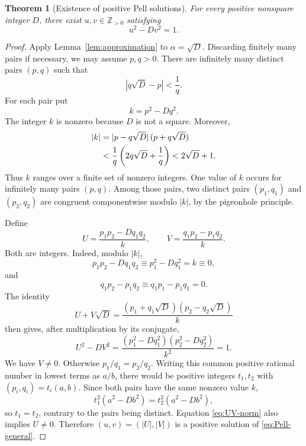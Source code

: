 \documentclass[11pt,a4paper]{amsart}
\newtheorem{theorem}{Theorem}[section]
\theoremstyle{definition}
\newcommand{\Z}{\mathbb Z}
\numberwithin{equation}{section}
\begin{document}
\begin{theorem}[Existence of positive Pell solutions]
\label{thm:Pell-existence}
For every positive nonsquare integer \(D\), there exist \(u,v\in\Z_{>0}\) satisfying
\begin{equation}
 u^2-Dv^2=1.
 \label{eq:Pell-general}
\end{equation}
\end{theorem}

\begin{proof}
Apply Lemma~\ref{lem:approximation} to \(\alpha=\sqrt D\).  Discarding finitely many
pairs if necessary, we may assume \(p,q>0\).  There are infinitely many distinct
pairs \((p,q)\) such that
\begin{equation}
 |q\sqrt D-p|<\frac1q.
 \label{eq:Pell-approx}
\end{equation}
For each pair put
\begin{equation}
 k=p^2-Dq^2.
\end{equation}
The integer \(k\) is nonzero because \(D\) is not a square.  Moreover,
\begin{align}
 |k|
 &=|p-q\sqrt D|\,(p+q\sqrt D)\notag\\
 &<\frac1q\left(2q\sqrt D+\frac1q\right)
 <2\sqrt D+1.
 \label{eq:k-bound}
\end{align}
Thus \(k\) ranges over a finite set of nonzero integers.  One value of \(k\) occurs
for infinitely many pairs \((p,q)\).  Among those pairs, two distinct pairs
\((p_1,q_1)\) and \((p_2,q_2)\) are congruent componentwise modulo \(|k|\), by the
pigeonhole principle.

Define
\begin{equation}
 U=\frac{p_1p_2-Dq_1q_2}{k},
 \qquad
 V=\frac{q_1p_2-p_1q_2}{k}.
 \label{eq:UV-construction}
\end{equation}
Both are integers.  Indeed, modulo \(|k|\),
\begin{equation}
 p_1p_2-Dq_1q_2\equiv p_1^2-Dq_1^2=k\equiv0,
\end{equation}
and
\begin{equation}
 q_1p_2-p_1q_2\equiv q_1p_1-p_1q_1=0.
\end{equation}
The identity
\begin{equation}
 U+V\sqrt D
 =\frac{(p_1+q_1\sqrt D)(p_2-q_2\sqrt D)}{k}
 \label{eq:UV-product}
\end{equation}
then gives, after multiplication by its conjugate,
\begin{equation}
 U^2-DV^2
 =\frac{(p_1^2-Dq_1^2)(p_2^2-Dq_2^2)}{k^2}=1.
 \label{eq:UV-norm}
\end{equation}
We have \(V\neq0\).  Otherwise \(p_1/q_1=p_2/q_2\).  Writing this common positive
rational number in lowest terms as \(a/b\), there would be positive integers
\(t_1,t_2\) with \((p_i,q_i)=t_i(a,b)\).  Since both pairs have the same nonzero
value \(k\),
\begin{equation}
 t_1^2(a^2-Db^2)=t_2^2(a^2-Db^2),
\end{equation}
so \(t_1=t_2\), contrary to the pairs being distinct.  Equation
\eqref{eq:UV-norm} also implies \(U\neq0\).  Therefore
\((u,v)=(|U|,|V|)\) is a positive solution of \eqref{eq:Pell-general}.
\end{proof}
\end{document}
